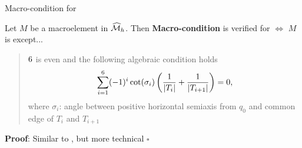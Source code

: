 \begin{frame}{Macro-condition for }
  \begin{theorem}
    Let $M$ be a macroelement in $\widehat{\cal M}_h$.
    Then \textbf{Macro-condition} is verified for 
    $\Leftrightarrow$ $M$ is
     except...

    \begin{quote}
      $6$ is even and the following algebraic condition
      holds \vspace{-0.6em} {\scriptsize
        \begin{equation*}
          \label{eq:ch1:instabilityMacroCondition}
          \sum_{i=1}^6 (-1)^{i} \cot(\sigma_i)\left(\frac1{|T_i|}+ \frac1{|T_{i+1}|} \right) = 0,
        \end{equation*}
      }
      \vspace{-0.6em}
      {\scriptsize
        where $\sigma_i$: angle between positive horizontal
        semiaxis from $q_0$ and  common edge of $T_i$ and $T_{i+1}$
      }
    \end{quote}
  \end{theorem}


\textbf{Proof}: Similar to , but
more technical \hfill $\square$
\par\mbox{}
\end{frame}



